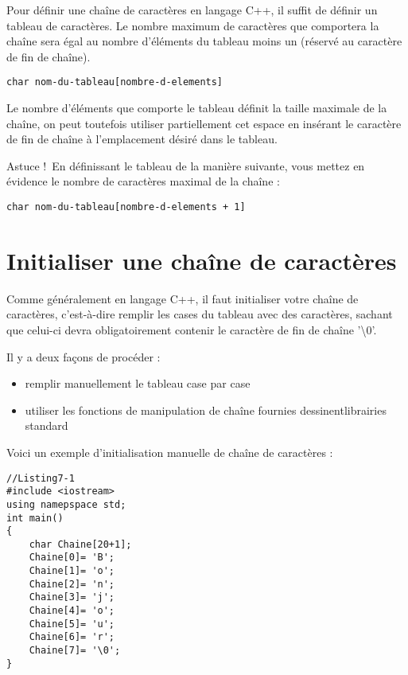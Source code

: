 \documentclass[a4paper, oneside,11pt]{book}
\begin{document}
Pour d\'efinir une cha\^ine de caract\`eres en langage C++, il suffit de
d\'efinir un tableau de caract\`eres. Le nombre maximum de caract\`eres que comportera
la cha\^ine sera \'egal au nombre d'\'el\'ements du tableau moins un (r\'eserv\'e au caract\`ere de fin de cha\^ine).


\begin{lstlisting}
char nom-du-tableau[nombre-d-elements]
\end{lstlisting}


    Le nombre d'\'el\'ements que comporte le tableau d\'efinit la taille maximale de la cha\^ine, on peut toutefois utiliser partiellement cet 
    espace en ins\'erant le caract\`ere
de fin de cha\^ine \`a l'emplacement d\'esir\'e dans le tableau.

\color{red}Astuce !\color{black}\  En d\'efinissant le tableau de la mani\`ere suivante, vous
mettez en \'evidence le nombre de caract\`eres maximal de la cha\^ine :


\begin{lstlisting}
char nom-du-tableau[nombre-d-elements + 1]
\end{lstlisting}

\section{Initialiser une cha\^ine de caract\`eres}

Comme g\'en\'eralement en langage C++, il faut initialiser votre cha\^ine de caract\`eres, c'est-\`a-dire
remplir les cases du tableau avec des caract\`eres, sachant que celui-ci devra obligatoirement contenir le caract\`ere
de fin de cha\^ine '\textbackslash 0'.

Il y a deux façons de proc\'eder :

\begin{itemize}
\item    remplir manuellement le tableau case par case
\item    utiliser les fonctions de manipulation de cha\^ine fournies dessinentlibrairies standard
\end{itemize}
Voici un exemple d'initialisation manuelle de cha\^ine de caract\`eres :

\begin{verbatim}
//Listing7-1
#include <iostream>
using namepspace std;
int main()
{
    char Chaine[20+1];
    Chaine[0]= 'B';
    Chaine[1]= 'o';
    Chaine[2]= 'n';
    Chaine[3]= 'j';
    Chaine[4]= 'o';
    Chaine[5]= 'u';
    Chaine[6]= 'r';
    Chaine[7]= '\0';
}
\end{verbatim}
\end{document}
